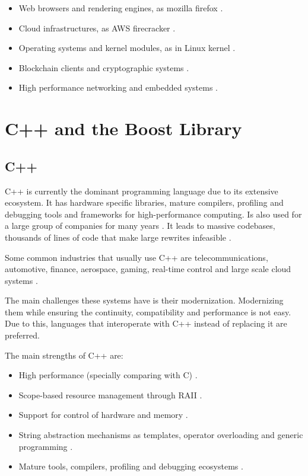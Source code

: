 \begin{itemize}
    \item Web browsers and rendering engines, as mozilla firefox \parencite{mozilla_rust_docs}.
    \item Cloud infrastructures, as AWS firecracker \parencite{FirecrackerProject}.
    \item Operating systems and kernel modules, as in Linux kernel \parencite{LinuxKernelRust}.
    \item Blockchain clients and cryptographic systems \parencite{RustBlockchain2024}.
    \item High performance networking and embedded systems \parencite{RustEmbedded}.
\end{itemize}

\section{C++ and the Boost Library}

\subsection{C++}

C++ is currently the dominant programming language due to its extensive ecosystem. 
It has hardware specific libraries, mature compilers, profiling and debugging tools and frameworks for 
high-performance computing. 
Is also used for a large group of companies for many years \parencite{stroustrup2013cpp}. 
It leads to massive codebases, thousands of lines of code that make large rewrites infeasible \parencite{CppCon2020}.

Some common industries that usually use C++ are telecommunications, automotive, finance, aerospace, 
gaming, real-time control and large scale cloud systems \parencite{Stroustrup2020}.

The main challenges these systems have is their modernization. Modernizing them while ensuring the continuity, 
compatibility and performance is not easy. Due to this, 
languages that interoperate with C++ instead of replacing it are preferred.

The main strengths of C++ are:
\begin{itemize}
    \item High performance (specially comparing with C) \parencite{Stroustrup2020}.
    \item Scope-based resource management through \gls{RAII} \parencite{stroustrup2013cpp}.
    \item Support for control of hardware and memory \parencite{stroustrup2013cpp}.
    \item String abstraction mechanisms as templates, operator overloading and generic programming \parencite{stroustrup2013cpp}.
    \item Mature tools, compilers, profiling and debugging ecosystems \parencite{CppCon2020}.
\end{itemize}

